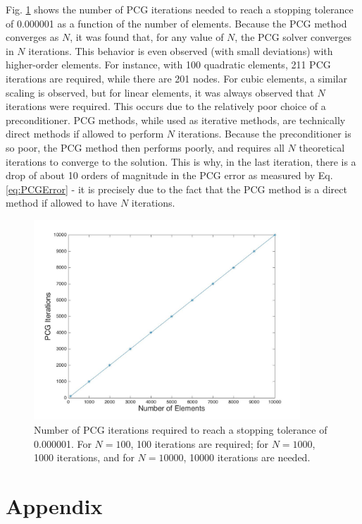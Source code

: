 \documentclass[10pt]{article}
\begin{document}
Fig. \ref{fig:PCGIterations} shows the number of PCG iterations needed to reach a stopping tolerance of 0.000001 as a function of the number of elements. Because the PCG method converges as \(N\), it was found that, for any value of \(N\), the PCG solver converges in \(N\) iterations. This behavior is even observed (with small deviations) with higher-order elements. For instance, with 100 quadratic elements, 211 PCG iterations are required, while there are 201 nodes. For cubic elements, a similar scaling is observed, but for linear elements, it was always observed that \(N\) iterations were required. This occurs due to the relatively poor choice of a preconditioner. PCG methods, while used as iterative methods, are technically direct methods if allowed to perform \(N\) iterations. Because the preconditioner is so poor, the PCG method then performs poorly, and requires all \(N\) theoretical iterations to converge to the solution. This is why, in the last iteration, there is a drop of about 10 orders of magnitude in the PCG error as measured by Eq. \eqref{eq:PCGError} - it is precisely due to the fact that the PCG method is a direct method if allowed to have \(N\) iterations.

\begin{figure}[H]
  \centering
  \includegraphics[width=10cm]{PCGIterations.jpg}
  \caption{Number of PCG iterations required to reach a stopping tolerance of 0.000001. For \(N=100\), 100 iterations are required; for \(N=1000\), 1000 iterations, and for \(N=10000\), 10000 iterations are needed.}
  \label{fig:PCGIterations}
\end{figure}

\section{Appendix}
\end{document}
